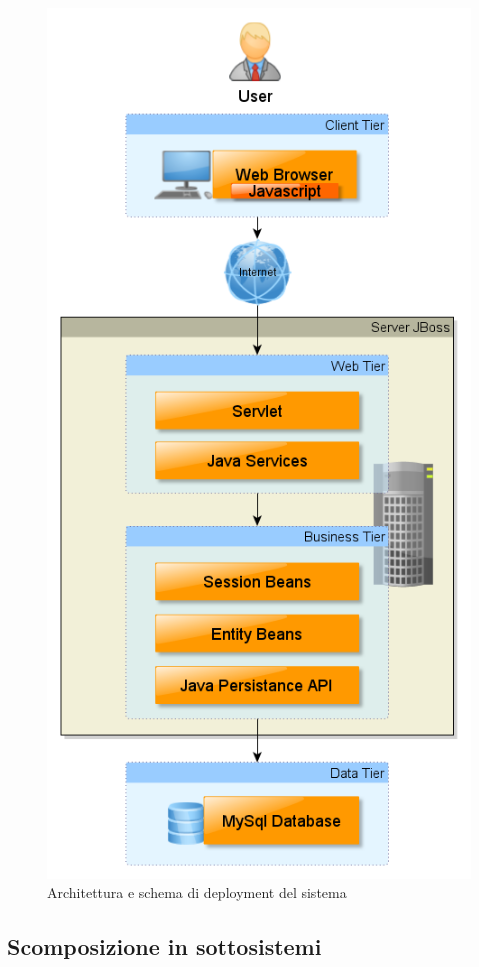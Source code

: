 \begin{figure}
\centering
\includegraphics[scale=0.6]{tierdesign.png}
\caption{\label{architettura} Architettura e schema di deployment del sistema}
\end{figure}

\subsection{Scomposizione in sottosistemi}

